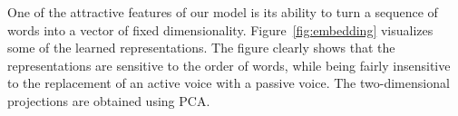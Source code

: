 
One of the attractive features of our model is its ability to turn a
sequence of words into a vector of fixed dimensionality.
Figure~\ref{fig:embedding} visualizes some of the learned
representations.  The figure clearly shows that the representations
are sensitive to the order of words, while being fairly insensitive to
the replacement of an active voice with a passive voice.  The
two-dimensional projections are obtained using PCA.






